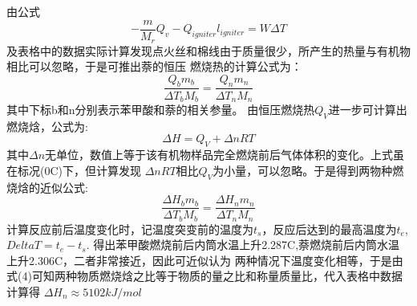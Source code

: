 ﻿\documentclass[10.5pt]{article}
\begin{document}
\begin{figure}[!ht]
  \centering
\end{figure}

\subsection{\textbf{}}


由公式
\begin{equation}
-\frac{m}{M_r}Q_v-Q_{igniter}l_{igniter}=W\Delta T
\end{equation}
及表格中的数据实际计算发现点火丝和棉线由于质量很少，所产生的热量与有机物相比可以忽略，于是可推出萘的恒压
燃烧热的计算公式为：
\begin{equation}
\frac{Q_b m_b}{\Delta T_b M_b}=\frac{Q_n m_n}{\Delta T_n M_n}
\end{equation}
其中下标b和n分别表示苯甲酸和萘的相关参量。
由恒压燃烧热$Q_V$进一步可计算出燃烧焓，公式为:
\begin{equation}
\Delta H=Q_V+\Delta n R T
\end{equation}
其中$\Delta n$无单位，数值上等于该有机物样品完全燃烧前后气体体积的变化。上式虽在标况(0\degree C)下，但计算发现 $\Delta n RT$相比$Q_V$为小量，可以忽略。于是得到两物种燃烧焓的近似公式:
\begin{equation}
\frac{{\Delta H}_b m_b}{\Delta T_b M_b}=\frac{{\Delta H}_n m_n}{\Delta T_n M_n}
\end{equation}
计算反应前后温度变化时，记温度突变前的温度为$t_s$，反应后达到的最高温度为$t_e$,$Delta T=t_e-t_s$.
得出苯甲酸燃烧前后内筒水温上升2.287\degree C,萘燃烧前后内筒水温上升2.306\degree C，二者非常接近，因此可近似认为
两种情况下温度变化相等，于是由式(4)可知两种物质燃烧焓之比等于物质的量之比和称量质量比，代入表格中数据计算得
${\Delta H}_n \approx 5102 kJ/mol $
\end{document}
